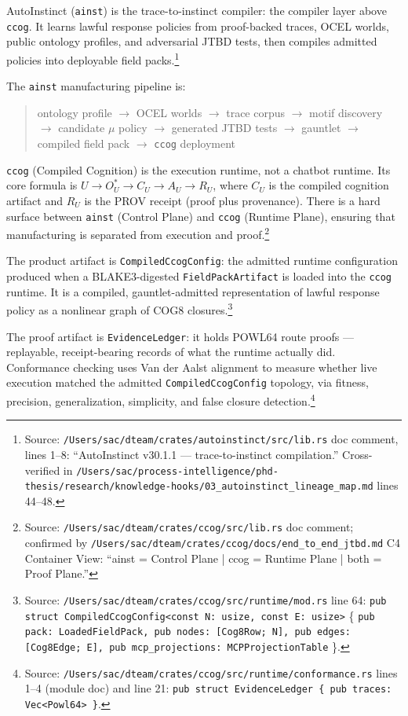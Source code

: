 AutoInstinct (\texttt{ainst}) is the trace-to-instinct compiler: the compiler layer above
\texttt{ccog}. It learns lawful response policies from proof-backed traces, OCEL worlds,
public ontology profiles, and adversarial JTBD tests, then compiles admitted policies into
deployable field packs.\footnote{Source:
\texttt{/Users/sac/dteam/crates/autoinstinct/src/lib.rs} doc comment, lines 1--8:
``AutoInstinct v30.1.1 --- trace-to-instinct compilation.'' Cross-verified in
\texttt{/Users/sac/process-intelligence/phd-thesis/research/knowledge-hooks/03\_autoinstinct\_lineage\_map.md}
lines 44--48.}

The \texttt{ainst} manufacturing pipeline is:

\begin{quote}
  ontology profile
  $\to$ OCEL worlds
  $\to$ trace corpus
  $\to$ motif discovery
  $\to$ candidate $\mu$ policy
  $\to$ generated JTBD tests
  $\to$ gauntlet
  $\to$ compiled field pack
  $\to$ \texttt{ccog} deployment
\end{quote}

\texttt{ccog} (Compiled Cognition) is the execution runtime, not a chatbot runtime. Its core
formula is $U \to O^{*}_U \to C_U \to A_U \to R_U$, where $C_U$ is the compiled cognition
artifact and $R_U$ is the PROV receipt (proof plus provenance). There is a hard surface
between \texttt{ainst} (Control Plane) and \texttt{ccog} (Runtime Plane), ensuring that
manufacturing is separated from execution and proof.\footnote{Source:
\texttt{/Users/sac/dteam/crates/ccog/src/lib.rs} doc comment; confirmed by
\texttt{/Users/sac/dteam/crates/ccog/docs/end\_to\_end\_jtbd.md} C4 Container View:
``ainst = Control Plane | ccog = Runtime Plane | both = Proof Plane.''}

The product artifact is \texttt{CompiledCcogConfig}: the admitted runtime configuration
produced when a BLAKE3-digested \texttt{FieldPackArtifact} is loaded into the \texttt{ccog}
runtime. It is a compiled, gauntlet-admitted representation of lawful response policy as a
nonlinear graph of COG8 closures.\footnote{Source:
\texttt{/Users/sac/dteam/crates/ccog/src/runtime/mod.rs} line 64:
\texttt{pub struct CompiledCcogConfig<const N: usize, const E: usize>} \{ \texttt{pub pack:
LoadedFieldPack, pub nodes: [Cog8Row; N], pub edges: [Cog8Edge; E], pub mcp\_projections:
MCPProjectionTable} \}.}

The proof artifact is \texttt{EvidenceLedger}: it holds POWL64 route proofs --- replayable,
receipt-bearing records of what the runtime actually did. Conformance checking uses Van der
Aalst alignment to measure whether live execution matched the admitted
\texttt{CompiledCcogConfig} topology, via fitness, precision, generalization, simplicity, and
false closure detection.\footnote{Source:
\texttt{/Users/sac/dteam/crates/ccog/src/runtime/conformance.rs} lines 1--4 (module doc) and
line 21: \texttt{pub struct EvidenceLedger \{ pub traces: Vec<Powl64> \}}.}


